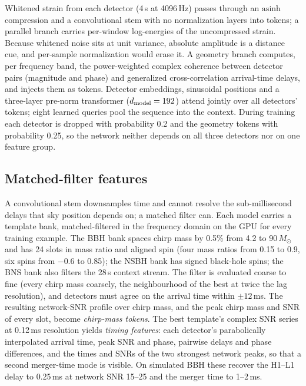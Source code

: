 \documentclass[twocolumn,linenumbers]{aastex701}
\newcommand{\msun}{M_{\odot}}
\begin{document}
Whitened strain from each detector (4\,s at 4096\,Hz) passes through an
$\mathrm{asinh}$ compression and a convolutional stem with no normalization
layers into tokens; a parallel branch carries per-window log-energies of the
uncompressed strain. Because whitened noise sits at unit variance, absolute
amplitude is a distance cue, and per-sample normalization would erase it. A
geometry branch computes, per frequency band, the power-weighted complex
coherence between detector pairs (magnitude and phase) and generalized
cross-correlation arrival-time delays, and injects them as tokens. Detector
embeddings, sinusoidal positions and a three-layer pre-norm transformer
\citep{Vaswani2017Attention} ($d_{\rm model}=192$) attend jointly over all
detectors' tokens; eight learned queries pool the sequence into the context.
During training each detector is dropped with probability 0.2 and the geometry
tokens with probability 0.25, so the network neither depends on all three
detectors nor on one feature group.

\subsection{Matched-filter features}

A convolutional stem downsamples time and cannot resolve the sub-millisecond
delays that sky position depends on; a matched filter can. Each model carries
a template bank, matched-filtered in the frequency domain on the GPU
\citep{Allen2012Findchirp} for every training example. The BBH bank spaces
chirp mass by 0.5\% from 4.2 to 90\,$\msun$ and has 24 slots in mass ratio and
aligned spin (four mass ratios from 0.15 to 0.9, six spins from $-0.6$ to
0.85); the NSBH bank has signed black-hole spins; the BNS bank also filters the
28\,s context stream. The filter is evaluated coarse to fine (every chirp mass
coarsely, the neighbourhood of the best at twice the lag resolution), and
detectors must agree on the arrival time within $\pm12$\,ms. The resulting
network-SNR profile over chirp mass, and the peak chirp mass and SNR of every
slot, become \emph{chirp-mass tokens}. The best template's complex SNR series
at 0.12\,ms resolution yields \emph{timing features}: each detector's
parabolically interpolated arrival time, peak SNR and phase, pairwise delays
and phase differences, and the times and SNRs of the two strongest network
peaks, so that a second merger-time mode is visible. On simulated BBH these
recover the H1--L1 delay to 0.25\,ms at network SNR 15--25 and the merger time
to 1--2\,ms.
\end{document}
